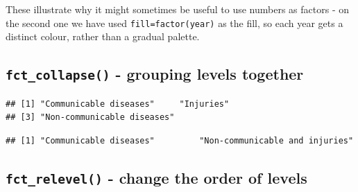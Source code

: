 \documentclass[]{book}
\makeatletter
\newenvironment{Shaded}{\begin{snugshade}}{\end{snugshade}}
\newcommand{\KeywordTok}[1]{\textcolor[rgb]{0.13,0.29,0.53}{\textbf{#1}}}
\newcommand{\StringTok}[1]{\textcolor[rgb]{0.31,0.60,0.02}{#1}}
\newcommand{\OperatorTok}[1]{\textcolor[rgb]{0.81,0.36,0.00}{\textbf{#1}}}
\newcommand{\NormalTok}[1]{#1}
\newenvironment{kframe}{%
\medskip{}
\setlength{\fboxsep}{.8em}
 \def\at@end@of@kframe{}%
 \ifinner\ifhmode%
  \def\at@end@of@kframe{\end{minipage}}%
  \begin{minipage}{\columnwidth}%
 \fi\fi%
 \def\FrameCommand##1{\hskip\@totalleftmargin \hskip-\fboxsep
 \colorbox{shadecolor}{##1}\hskip-\fboxsep
     \hskip-\linewidth \hskip-\@totalleftmargin \hskip\columnwidth}%
 \MakeFramed {\advance\hsize-\width
   \@totalleftmargin\z@ \linewidth\hsize
   \@setminipage}}%
 {\par\unskip\endMakeFramed%
 \at@end@of@kframe}
\renewenvironment{Shaded}{\begin{kframe}}{\end{kframe}}
\makeatother
\begin{document}
These illustrate why it might sometimes be useful to use numbers as
factors - on the second one we have used \texttt{fill=factor(year)} as
the fill, so each year gets a distinct colour, rather than a gradual
palette.

\subsection{\texorpdfstring{\texttt{fct\_collapse()} - grouping levels
together}{fct\_collapse() - grouping levels together}}\label{fct_collapse---grouping-levels-together}

\begin{Shaded}
\end{Shaded}

\begin{verbatim}
## [1] "Communicable diseases"     "Injuries"                 
## [3] "Non-communicable diseases"
\end{verbatim}

\begin{Shaded}
\end{Shaded}

\begin{verbatim}
## [1] "Communicable diseases"         "Non-communicable and injuries"
\end{verbatim}

\subsection{\texorpdfstring{\texttt{fct\_relevel()} - change the order
of
levels}{fct\_relevel() - change the order of levels}}\label{fct_relevel---change-the-order-of-levels}
\end{document}

